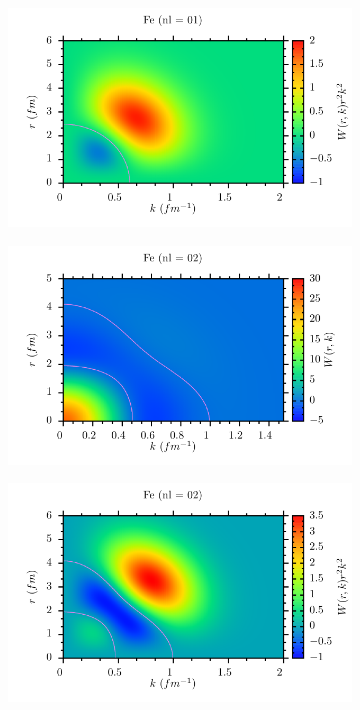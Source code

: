 \documentclass[11pt,twoside]{book}
\begin{document}
\begin{figure}
\begin{subfigure}[b]{0.49\textwidth}
 \end{subfigure} 
 \begin{subfigure}[b]{0.49\textwidth} 
 	\includegraphics[width=\textwidth]{./figuren/Fe_wigner_01prob.pdf}  
 \end{subfigure} 
 \begin{subfigure}[b]{0.49\textwidth} 
 	\includegraphics[width=\textwidth]{./figuren/Fe_wigner_02.pdf}  
 \end{subfigure}
 \begin{subfigure}[b]{0.49\textwidth} 
 	\includegraphics[width=\textwidth]{./figuren/Fe_wigner_02prob.pdf}  

\end{subfigure}
\end{figure}
\end{document}
